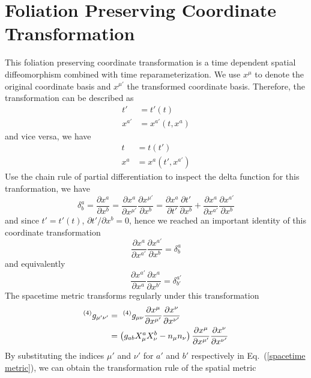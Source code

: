 \documentclass[letterpaper,nofootinbib,prd,amsmath,onecolumn]{revtex4-1}
\begin{document}
\section{Foliation Preserving Coordinate Transformation}\label{transform}
This foliation preserving coordinate transformation is a time dependent spatial diffeomorphism combined with time reparameterization. We use $x^{\mu}$ to denote the original coordinate basis and $x^{\mu'}$ the transformed coordinate basis. Therefore, the transformation can be described as
\begin{align*}
t' & = t'\left(t\right)\\
x^{a'} & = x^{a'}\left(t,x^{a}\right)
\end{align*}
and vice versa, we have
\begin{align*}
t & = t(t')\\
x^{a} & = x^{a}(t',x^{a'})
\end{align*}
Use the chain rule of partial differentiation to inspect the delta function for this tranformation, we have
\[
\delta^{a}_{b} = \frac{\partial x^{a}}{\partial x^{b}} = \frac{\partial x^{a}}{\partial x^{\mu'}}\frac{\partial x^{\mu'}}{\partial x^{b}} = \frac{\partial x^{a}}{\partial t'}\frac{\partial t'}{\partial x^{b}} + \frac{\partial x^{a}}{\partial x^{a'}}\frac{\partial x^{a'}}{\partial x^{b}}
\]
and since $t' = t'\left(t\right)$, $\partial t'/\partial x^{b} = 0$, hence we reached an important identity of this coordinate transformation
\begin{equation}
\frac{\partial x^{a}}{\partial x^{a'}}\frac{\partial x^{a'}}{\partial x^{b}} = \delta^{a}_{b}
\end{equation}
and equivalently
\begin{equation}
\frac{\partial x^{a'}}{\partial x^{a}}\frac{\partial x^{a}}{\partial x^{b'}} = \delta^{a'}_{b'}
\end{equation}
The spacetime metric transforms regularly under this transformation
\begin{align}\label{spacetime metric}
^{\left(4\right)}g_{\mu'\nu'} &=~^{\left(4\right)}g_{\mu\nu}\frac{\partial x^{\mu}}{\partial x^{\mu'}}\frac{\partial x^{\nu}}{\partial x^{\nu'}}\notag\\
& = \left(g_{ab}X^{a}_{\mu}X^{b}_{\nu} - n_{\mu}n_{\nu}\right)\frac{\partial x^{\mu}}{\partial x^{\mu'}}\frac{\partial x^{\nu}}{\partial x^{\nu'}}
\end{align}
By substituting the indices $\mu'$ and $\nu'$ for $a'$ and $b'$ respectively in Eq.~(\ref{spacetime metric}), we can obtain the transformation rule of the spatial metric
\end{document}
